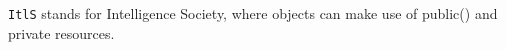 
\verb|ItlS| stands for Intelligence Society, where objects can make use of public() and private resources.
